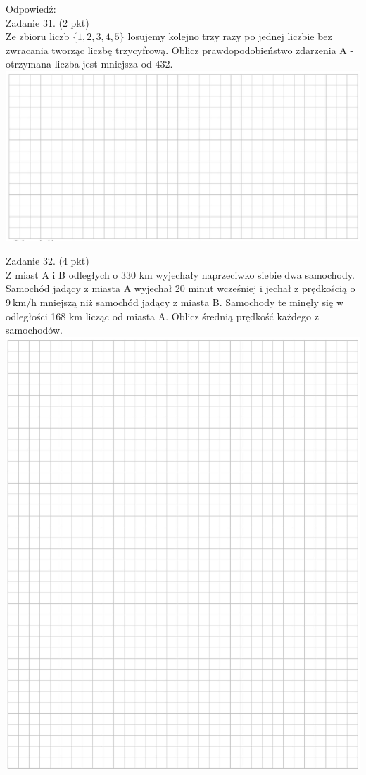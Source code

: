 \documentclass[10pt]{article}
\begin{document}
Odpowiedź:\\
Zadanie 31. (2 pkt)\\
Ze zbioru liczb \(\{1,2,3,4,5\}\) losujemy kolejno trzy razy po jednej liczbie bez zwracania tworząc liczbę trzycyfrową. Oblicz prawdopodobieństwo zdarzenia A - otrzymana liczba jest mniejsza od 432.\\
\includegraphics[max width=\textwidth, center]{2024_11_21_9a9f600c3b3af5013d80g-12}

Zadanie 32. (4 pkt)\\
Z miast A i B odległych o 330 km wyjechały naprzeciwko siebie dwa samochody. Samochód jadący z miasta A wyjechał 20 minut wcześniej i jechał z prędkością o \(9 \mathrm{~km} / \mathrm{h}\) mniejszą niż samochód jadący z miasta B. Samochody te minęły się w odległości 168 km licząc od miasta A. Oblicz średnią prędkość każdego z samochodów.\\
\includegraphics[max width=\textwidth, center]{2024_11_21_9a9f600c3b3af5013d80g-13}
\end{document}
